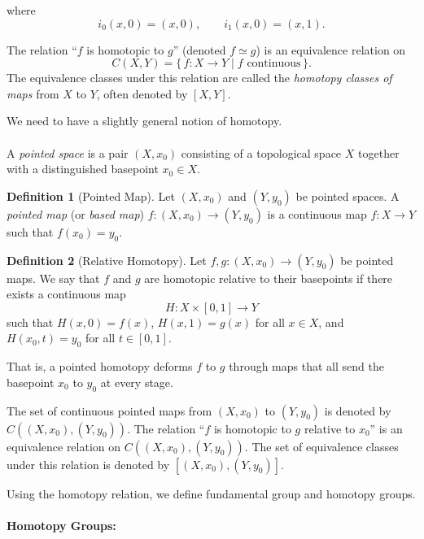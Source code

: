 \documentclass[11pt]{article}
\theoremstyle{definition}
\newtheorem{definition}{Definition}[section]
\theoremstyle{plain}
\begin{document}
where
\[
    i_0(x,0) = (x,0), \qquad i_1(x,0) = (x,1).
\]

The relation ``$f$ is homotopic to $g$'' (denoted $f \simeq g$) is an equivalence relation on
\[
    C(X,Y) = \{\, f : X \to Y \mid f \text{ continuous} \,\}.
\]
The equivalence classes under this relation are called the \emph{homotopy classes of maps} from $X$ to $Y$, often denoted by $[X,Y]$.

We need to have a slightly general notion of homotopy.

\paragraph{}
A \emph{pointed space} is a pair $(X, x_0)$ consisting of a topological space $X$ together with a distinguished basepoint $x_0 \in X$.

\begin{definition}[Pointed Map]
    Let $(X, x_0)$ and $(Y, y_0)$ be pointed spaces. A \emph{pointed map} (or \emph{based map}) $f : (X, x_0) \to (Y, y_0)$ is a continuous map $f : X \to Y$ such that $f(x_0) = y_0$.
\end{definition}

\begin{definition}[Relative Homotopy]
    Let $f, g : (X, x_0) \to (Y, y_0)$ be pointed maps. We say that $f$ and $g$ are homotopic relative to their basepoints if there exists a continuous map
    \[
        H : X \times [0,1] \to Y
    \]
    such that $H(x,0) = f(x)$, $H(x,1) = g(x)$ for all $x \in X$, and $H(x_0, t) = y_0$ for all $t \in [0,1]$.
\end{definition}

That is, a pointed homotopy deforms $f$ to $g$ through maps that all send the basepoint $x_0$ to $y_0$ at every stage.

The set of continuous pointed maps from $(X, x_0)$ to $(Y, y_0)$ is denoted  by $C((X, x_0), (Y, y_0))$.
The relation ``$f$ is  homotopic to $g$ relative to $x_0$''  is an equivalence relation on $C((X, x_0), (Y, y_0))$.
The set of  equivalence classes under this relation is denoted by $[(X, x_0), (Y, y_0)]$.





Using the homotopy relation, we define fundamental group and homotopy groups.








\paragraph{Homotopy Groups:}
\end{document}
